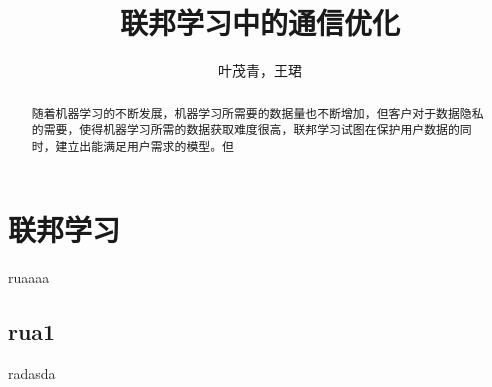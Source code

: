 \documentclass[10pt,twocolumn,letterpaper]{article}
\begin{document}
    \title{联邦学习中的通信优化}
    \author{叶茂青，王珺}

    \maketitle
    \begin{abstract}
		随着机器学习的不断发展，机器学习所需要的数据量也不断增加，但客户对于数据隐私的需要，使得机器学习所需的数据获取难度很高，联邦学习试图在保护用户数据的同时，建立出能满足用户需求的模型。但
    \end{abstract}
    
    \section{联邦学习}
    ruaaaa\cite{li2019federated}
    \subsection{rua1}
    radasda

    {\small
         
        
    }
\end{document}
